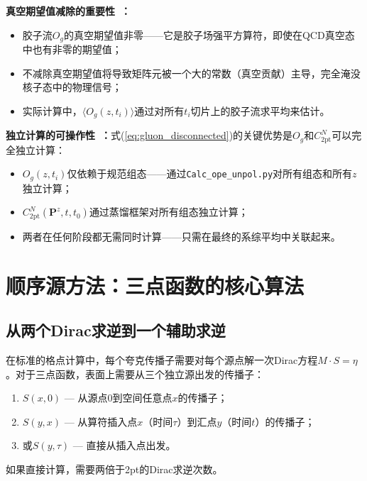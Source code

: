 \documentclass[12pt,a4paper]{ctexart}
\theoremstyle{definition}
\begin{document}
\textbf{真空期望值减除的重要性~\cite{gluonQuasiOpReport2026}：}
\begin{itemize}[leftmargin=*]
    \item 胶子流$O_g$的真空期望值非零——它是胶子场强平方算符，即使在QCD真空态中也有非零的期望值；
    \item 不减除真空期望值将导致矩阵元被一个大的常数（真空贡献）主导，完全淹没核子态中的物理信号；
    \item 实际计算中，$\langle O_g(z, t_i)\rangle$通过对所有$t_i$切片上的胶子流求平均来估计。
\end{itemize}

\textbf{独立计算的可操作性~\cite{gluonQuasiOpReport2026}：}式(\ref{eq:gluon_disconnected})的关键优势是$O_g$和$C_{2\text{pt}}^N$可以完全独立计算：
\begin{itemize}[leftmargin=*]
    \item $O_g(z, t_i)$仅依赖于规范组态——通过\texttt{Calc\_ope\_unpol.py}对所有组态和所有$z$独立计算；
    \item $C_{2\text{pt}}^N(\mathbf{P}^z, t, t_0)$通过蒸馏框架对所有组态独立计算；
    \item 两者在任何阶段都无需同时计算——只需在最终的系综平均中关联起来。
\end{itemize}

\section{顺序源方法：三点函数的核心算法}

\subsection{从两个Dirac求逆到一个辅助求逆}

在标准的格点计算中，每个夸克传播子需要对每个源点解一次Dirac方程$M \cdot S = \eta$。对于三点函数，表面上需要从三个独立源出发的传播子：
\begin{enumerate}[leftmargin=*]
    \item $S(x, 0)$ — 从源点0到空间任意点$x$的传播子；
    \item $S(y, x)$ — 从算符插入点$x$（时间$\tau$）到汇点$y$（时间$t$）的传播子；
    \item 或$S(y, \tau)$ — 直接从插入点出发。
\end{enumerate}

如果直接计算，需要两倍于2pt的Dirac求逆次数。
\end{document}
